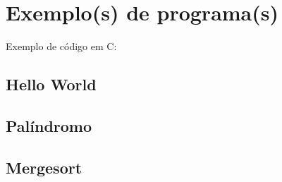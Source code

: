 \chapter{Exemplo(s) de programa(s)}
\setcounter{section}{0}

Exemplo de código em C: 
    
\section{Hello World}



\section{Palíndromo}



\section{Mergesort}


\newpage
